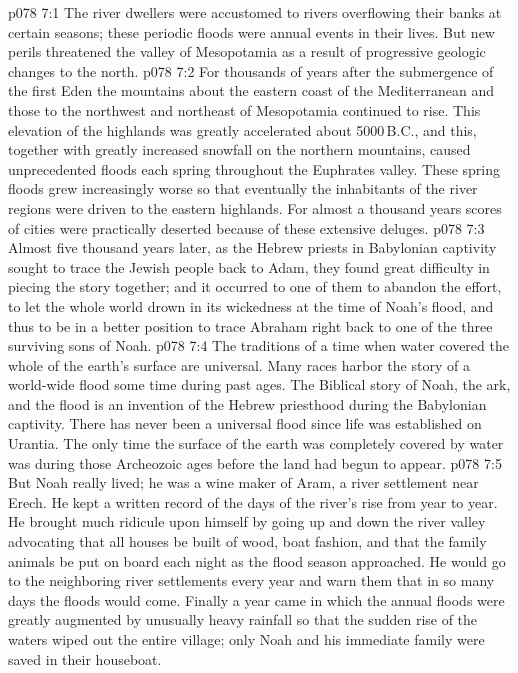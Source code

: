 \vs p078 7:1 The river dwellers were accustomed to rivers overflowing their banks at certain seasons; these periodic floods were annual events in their lives. But new perils threatened the valley of Mesopotamia as a result of progressive geologic changes to the north.
\vs p078 7:2 For thousands of years after the submergence of the first Eden the mountains about the eastern coast of the Mediterranean and those to the northwest and northeast of Mesopotamia continued to rise. This elevation of the highlands was greatly accelerated about 5000\,B.C., and this, together with greatly increased snowfall on the northern mountains, caused unprecedented floods each spring throughout the Euphrates valley. These spring floods grew increasingly worse so that eventually the inhabitants of the river regions were driven to the eastern highlands. For almost a thousand years scores of cities were practically deserted because of these extensive deluges.
\vs p078 7:3 \pc Almost five thousand years later, as the Hebrew priests in Babylonian captivity sought to trace the Jewish people back to Adam, they found great difficulty in piecing the story together; and it occurred to one of them to abandon the effort, to let the whole world drown in its wickedness at the time of Noah’s flood, and thus to be in a better position to trace Abraham right back to one of the three surviving sons of Noah.
\vs p078 7:4 The traditions of a time when water covered the whole of the earth’s surface are universal. Many races harbor the story of a world\hyp{}wide flood some time during past ages. The Biblical story of Noah, the ark, and the flood is an invention of the Hebrew priesthood during the Babylonian captivity. There has never been a universal flood since life was established on Urantia. The only time the surface of the earth was completely covered by water was during those Archeozoic ages before the land had begun to appear.
\vs p078 7:5 But Noah really lived; he was a wine maker of Aram, a river settlement near Erech. He kept a written record of the days of the river’s rise from year to year. He brought much ridicule upon himself by going up and down the river valley advocating that all houses be built of wood, boat fashion, and that the family animals be put on board each night as the flood season approached. He would go to the neighboring river settlements every year and warn them that in so many days the floods would come. Finally a year came in which the annual floods were greatly augmented by unusually heavy rainfall so that the sudden rise of the waters wiped out the entire village; only Noah and his immediate family were saved in their houseboat.
